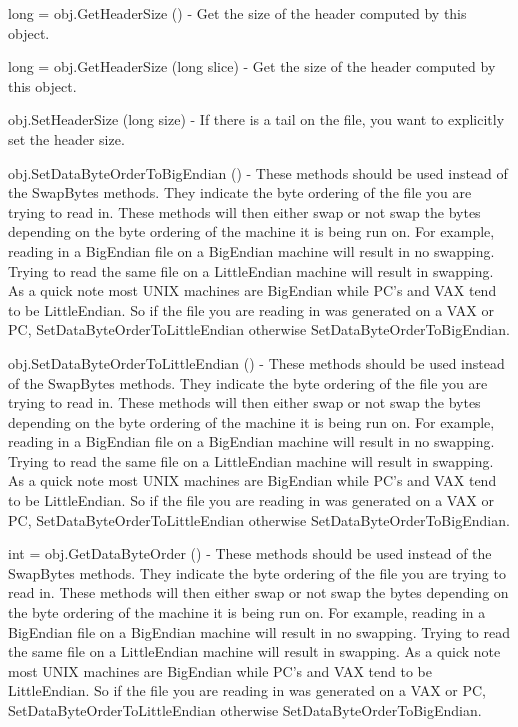 \begin{DoxyItemize}
\item {\ttfamily long = obj.\-Get\-Header\-Size ()} -\/ Get the size of the header computed by this object.  
\item {\ttfamily long = obj.\-Get\-Header\-Size (long slice)} -\/ Get the size of the header computed by this object.  
\item {\ttfamily obj.\-Set\-Header\-Size (long size)} -\/ If there is a tail on the file, you want to explicitly set the header size.  
\item {\ttfamily obj.\-Set\-Data\-Byte\-Order\-To\-Big\-Endian ()} -\/ These methods should be used instead of the Swap\-Bytes methods. They indicate the byte ordering of the file you are trying to read in. These methods will then either swap or not swap the bytes depending on the byte ordering of the machine it is being run on. For example, reading in a Big\-Endian file on a Big\-Endian machine will result in no swapping. Trying to read the same file on a Little\-Endian machine will result in swapping. As a quick note most U\-N\-I\-X machines are Big\-Endian while P\-C's and V\-A\-X tend to be Little\-Endian. So if the file you are reading in was generated on a V\-A\-X or P\-C, Set\-Data\-Byte\-Order\-To\-Little\-Endian otherwise Set\-Data\-Byte\-Order\-To\-Big\-Endian.  
\item {\ttfamily obj.\-Set\-Data\-Byte\-Order\-To\-Little\-Endian ()} -\/ These methods should be used instead of the Swap\-Bytes methods. They indicate the byte ordering of the file you are trying to read in. These methods will then either swap or not swap the bytes depending on the byte ordering of the machine it is being run on. For example, reading in a Big\-Endian file on a Big\-Endian machine will result in no swapping. Trying to read the same file on a Little\-Endian machine will result in swapping. As a quick note most U\-N\-I\-X machines are Big\-Endian while P\-C's and V\-A\-X tend to be Little\-Endian. So if the file you are reading in was generated on a V\-A\-X or P\-C, Set\-Data\-Byte\-Order\-To\-Little\-Endian otherwise Set\-Data\-Byte\-Order\-To\-Big\-Endian.  
\item {\ttfamily int = obj.\-Get\-Data\-Byte\-Order ()} -\/ These methods should be used instead of the Swap\-Bytes methods. They indicate the byte ordering of the file you are trying to read in. These methods will then either swap or not swap the bytes depending on the byte ordering of the machine it is being run on. For example, reading in a Big\-Endian file on a Big\-Endian machine will result in no swapping. Trying to read the same file on a Little\-Endian machine will result in swapping. As a quick note most U\-N\-I\-X machines are Big\-Endian while P\-C's and V\-A\-X tend to be Little\-Endian. So if the file you are reading in was generated on a V\-A\-X or P\-C, Set\-Data\-Byte\-Order\-To\-Little\-Endian otherwise Set\-Data\-Byte\-Order\-To\-Big\-Endian.  

\end{DoxyItemize}
